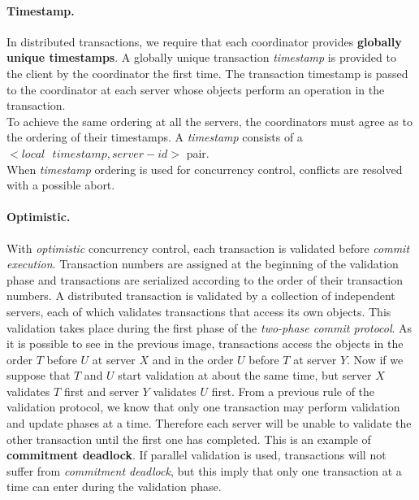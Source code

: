 \paragraph*{Timestamp.} In distributed transactions, we require that each coordinator provides \textbf{globally unique timestamps}. A globally unique transaction \textit{timestamp} is provided to the client by the coordinator the first time. The transaction timestamp is passed to the coordinator at each server whose objects perform an operation in the transaction.\\
To achieve the same ordering at all the servers, the coordinators must agree as to the ordering of their timestamps. A \textit{timestamp} consists of a $<local\text{ }timestamp, server-id>$ pair. \\
When \textit{timestamp} ordering is used for concurrency control, conflicts are resolved with a possible abort.

\paragraph*{Optimistic.} With \textit{optimistic} concurrency control, each transaction is validated before \textit{commit execution}. Transaction numbers are assigned at the beginning of the validation phase and transactions are serialized according to the order of their transaction numbers. A distributed transaction is validated by a collection of independent servers, each of which validates transactions that access its own objects. This validation takes place during the first phase of the \textit{two-phase commit protocol}.
As it is possible to see in the previous image, transactions access the objects in the order $T$ before $U$ at server $X$ and in the order $U$ before $T$ at server $Y$. Now if we suppose that $T$ and $U$ start validation at about the same time, but server $X$ validates $T$ first and server $Y$ validates $U$ first. 
From a previous rule of the validation protocol, we know that only one transaction may perform validation and update phases at a time. Therefore each server will be unable to validate the other transaction until the first one has completed. This is an example of \textbf{commitment deadlock}.
If parallel validation is used, transactions will not suffer from \textit{commitment deadlock}, but this imply that only one transaction at a time can enter during the validation phase.

